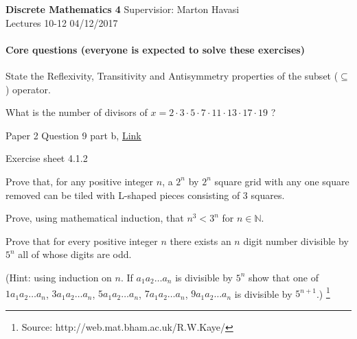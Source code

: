 \documentclass{exam}
\begin{document}
\noindent
\large\textbf{Discrete Mathematics 4} \hfill Supervisior: Marton Havasi \\
\normalsize Lectures 10-12 \hfill 04/12/2017

\paragraph{Core questions (everyone is expected to solve these exercises)}
\begin{questions}
\question State the Reflexivity, Transitivity and Antisymmetry properties of the subset ($\subseteq$) operator.

\question What is the number of divisors of $x=2\cdot 3\cdot 5\cdot 7\cdot 11\cdot 13 \cdot 17 \cdot 19$ ?

 Paper 2 Question 9 part b, \href{http://www.cl.cam.ac.uk/teaching/exams/pastpapers/y2015p2q9.pdf}{Link}

\question Exercise sheet 4.1.2 

Prove that, for any positive integer $n$, a $2^n$ by $2^n$
square grid with any one square removed can be tiled
with L-shaped pieces consisting of 3 squares.

\question Prove, using mathematical induction, that $n^3 < 3^n$ for $n \in \mathds{N}$.

\question Prove that for every positive integer $n$ there exists an $n$ digit number divisible by $5^n$ all of whose digits are odd. 

(Hint: using induction on $n$. If $a_1a_2 \dots a_n$ is divisible by $5^n$ show that one of $1a_1a_2\dots a_n$, $3a_1a_2\dots a_n$, $5a_1a_2\dots a_n$, $7a_1a_2\dots a_n$, $9a_1a_2\dots a_n$ is divisible by $5^{n+1}$.) \footnote{Source: http://web.mat.bham.ac.uk/R.W.Kaye/}

\end{questions}
\end{document}
